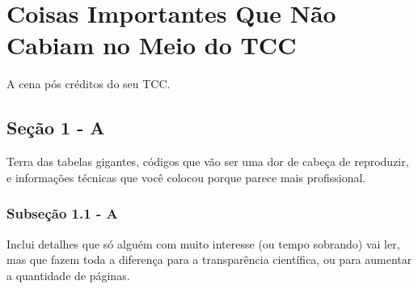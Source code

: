 %
%

\chapter{Coisas Importantes Que Não Cabiam no Meio do TCC}\label{apen:apendiceA}

A cena pós créditos do seu TCC. 

\section{Seção 1 - A}

Terra das tabelas gigantes, códigos que vão ser uma dor de cabeça de reproduzir, e informações técnicas que você colocou porque parece mais profissional.

\subsection{Subseção 1.1 - A}

Inclui detalhes que só alguém com muito interesse (ou tempo sobrando) vai ler, mas que fazem toda a diferença para a transparência científica, ou para aumentar a quantidade de páginas.
